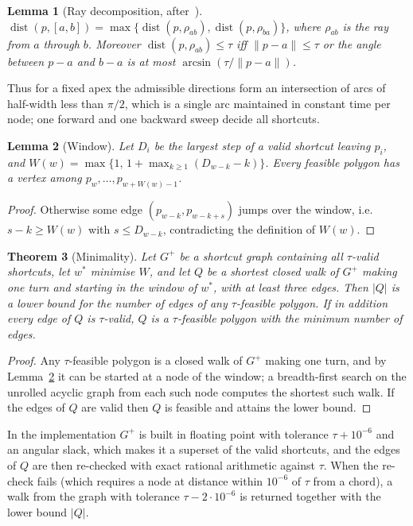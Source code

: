 \documentclass[11pt,a4paper]{article}
\newtheorem{theorem}{Theorem}
\newtheorem{lemma}[theorem]{Lemma}
\theoremstyle{definition}
\theoremstyle{remark}
\newcommand{\dist}{\operatorname{dist}}
\newcommand{\seg}[2]{[#1,#2]}
\begin{document}
\begin{lemma}[Ray decomposition, after~\cite{chan1996}]\label{lem:rays}
$\dist(p,\seg ab)=\max\{\dist(p,\rho_{ab}),\dist(p,\rho_{ba})\}$, where
$\rho_{ab}$ is the ray from $a$ through $b$. Moreover
$\dist(p,\rho_{ab})\le\tau$ iff $\lVert p-a\rVert\le\tau$ or the angle between
$p-a$ and $b-a$ is at most $\arcsin(\tau/\lVert p-a\rVert)$.
\end{lemma}

Thus for a fixed apex the admissible directions form an intersection of arcs
of half-width less than $\pi/2$, which is a single arc maintained in constant
time per node; one forward and one backward sweep decide all shortcuts.

\begin{lemma}[Window]\label{lem:window}
Let $D_i$ be the largest step of a valid shortcut leaving $p_i$, and
$W(w)=\max\{1,\,1+\max_{k\ge1}(D_{w-k}-k)\}$. Every feasible polygon has a
vertex among $p_w,\dots,p_{w+W(w)-1}$.
\end{lemma}
\begin{proof}
Otherwise some edge $(p_{w-k},p_{w-k+s})$ jumps over the window, i.e.\
$s-k\ge W(w)$ with $s\le D_{w-k}$, contradicting the definition of $W(w)$.
\end{proof}

\begin{theorem}[Minimality]\label{thm:minlink}
Let $G^{+}$ be a shortcut graph containing all $\tau$-valid shortcuts, let
$w^\ast$ minimise $W$, and let $Q$ be a shortest closed walk of $G^{+}$ making
one turn and starting in the window of $w^\ast$, with at least three edges.
Then $|Q|$ is a lower bound for the number of edges of any $\tau$-feasible
polygon. If in addition every edge of $Q$ is $\tau$-valid, $Q$ is a
$\tau$-feasible polygon with the minimum number of edges.
\end{theorem}
\begin{proof}
Any $\tau$-feasible polygon is a closed walk of $G^{+}$ making one turn, and by
Lemma~\ref{lem:window} it can be started at a node of the window; a
breadth-first search on the unrolled acyclic graph from each such node
computes the shortest such walk. If the edges of $Q$ are valid then $Q$ is
feasible and attains the lower bound.
\end{proof}

In the implementation $G^{+}$ is built in floating point with tolerance
$\tau+10^{-6}$ and an angular slack, which makes it a superset of the valid
shortcuts, and the edges of $Q$ are then re-checked with exact rational
arithmetic against $\tau$. When the re-check fails (which requires a node at
distance within $10^{-6}$ of $\tau$ from a chord), a walk from the graph with
tolerance $\tau-2\cdot10^{-6}$ is returned together with the lower bound
$|Q|$.
\end{document}
